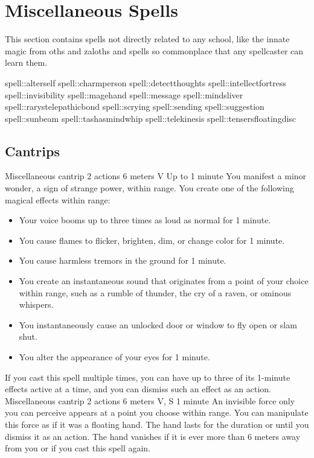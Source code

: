 \section{Miscellaneous Spells}
This section contains spells not directly related to any school, like the innate magic from oths and zaloths and spells so commonplace that any spellcaster can learn them.

spell::alterself
spell::charmperson
spell::detectthoughts
spell::intellectfortress
spell::invisibility
spell::magehand
spell::message
spell::mindsliver
spell::rarystelepathicbond
spell::scrying
spell::sending
spell::suggestion
spell::sunbeam
spell::tashasmindwhip
spell::telekinesis
spell::tensersfloatingdisc

\subsection*{Cantrips}
        {Miscellaneous cantrip}
        {2 actions}
        {6 meters}
        {V}
        {Up to 1 minute}
        You manifest a minor wonder, a sign of strange power, within range.
        You create one of the following magical effects within range:
        \begin{itemize}
            \item Your voice booms up to three times as loud as normal for 1 minute.
            \item You cause flames to flicker, brighten, dim, or change color for 1 minute.
            \item You cause harmless tremors in the ground for 1 minute.
            \item You create an instantaneous sound that originates from a point of your choice within range, such as a rumble of thunder, the cry of a raven, or ominous whispers.
            \item You instantaneously cause an unlocked door or window to fly open or slam shut.
            \item You alter the appearance of your eyes for 1 minute.
        \end{itemize}
        If you cast this spell multiple times, you can have up to three of its 1-minute effects active at a time, and you can dismiss such an effect as an action.
        {Miscellaneous cantrip}
        {2 actions}
        {6 meters}
        {V, S}
        {1 minute}
        An invisible force only you can perceive appears at a point you choose within range.
        You can manipulate this force as if it was a floating hand.
        The hand lasts for the duration or until you dismiss it as an action.
        The hand vanishes if it is ever more than 6 meters away from you or if you cast this spell again.

